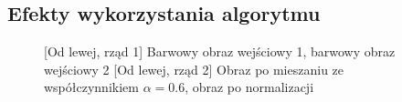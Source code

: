 \documentclass[a4paper,12pt, titlepage]{report}
\begin{document}
\subsection*{Efekty wykorzystania algorytmu}
\begin{figure}[h]
    \centering
    \qquad
    \caption{[Od lewej, rząd 1] Barwowy obraz wejściowy 1, barwowy obraz wejściowy 2 [Od lewej, rząd 2] Obraz po mieszaniu ze współczynnikiem \(\alpha=0.6\), obraz po normalizacji}%
    \label{fig:rysunek}%
\end{figure}
\end{document}

